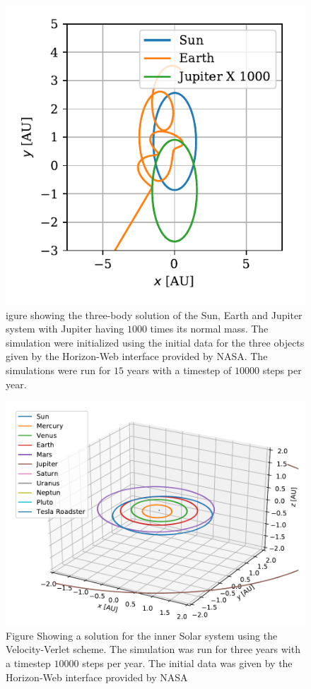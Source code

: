 \documentclass[twocolumn]{aastex62}
\begin{document}
\begin{figure}
\includegraphics[scale=1]{Figures/jupiter1000.pdf}
\caption{igure showing the three-body solution of the Sun, Earth and Jupiter system
with Jupiter having $1000$ times its normal mass. The simulation were initialized using the
initial data for the three objects given by the Horizon-Web interface provided by NASA. The simulations
were run for $15$ years with a timestep of $10000$ steps per year.}
\label{fig:jupiter1000}
\end{figure}

\begin{figure}
\includegraphics[scale=1]{Figures/InnerSolarSystem.pdf}
\caption{Figure Showing a solution for the inner Solar system using the Velocity-Verlet scheme. The simulation was run for three years with a timestep $10000$ steps per year. The initial data was given by the Horizon-Web interface provided by NASA}
\label{fig:outer}
\end{figure}
\end{document}
